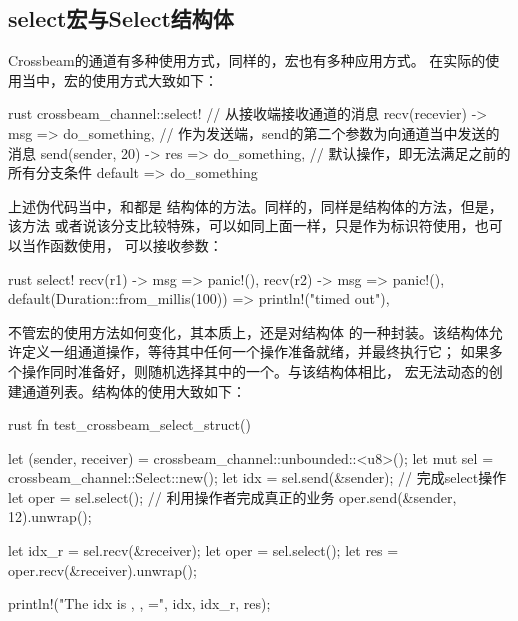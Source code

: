\subsection{select宏与Select结构体}
Crossbeam的通道有多种使用方式，同样的，宏也有多种应用方式。
在实际的使用当中，宏的使用方式大致如下：
\begin{code-block}{rust}
crossbeam_channel::select! {
    // 从接收端接收通道的消息
    recv(recevier) -> msg => do_something,
    // 作为发送端，send的第二个参数为向通道当中发送的消息
    send(sender, 20) -> res => do_something,
    // 默认操作，即无法满足之前的所有分支条件
    default => do_something
}
\end{code-block}

上述伪代码当中，和都是
结构体的方法。同样的，同样是结构体的方法，但是，该方法
或者说该分支比较特殊，可以如同上面一样，只是作为标识符使用，也可以当作函数使用，
可以接收参数：
\begin{code-block}{rust}
select! {
    recv(r1) -> msg => panic!(),
    recv(r2) -> msg => panic!(),
    default(Duration::from_millis(100)) => println!("timed out"),
}
\end{code-block}

不管宏的使用方法如何变化，其本质上，还是对结构体
的一种封装。该结构体允许定义一组通道操作，等待其中任何一个操作准备就绪，并最终执行它；
如果多个操作同时准备好，则随机选择其中的一个。与该结构体相比，
宏无法动态的创建通道列表。结构体的使用大致如下：
\begin{code-block}{rust}
fn test_crossbeam_select_struct() {
    let (sender, receiver) = crossbeam_channel::unbounded::<u8>();
    let mut sel = crossbeam_channel::Select::new();
    let idx = sel.send(&sender);
    // 完成select操作
    let oper = sel.select();
    // 利用操作者完成真正的业务
    oper.send(&sender, 12).unwrap();

    let idx_r = sel.recv(&receiver);
    let oper = sel.select();
    let res = oper.recv(&receiver).unwrap();

    println!("The idx is {}, {}, ={}", idx, idx_r, res);
}
\end{code-block}

